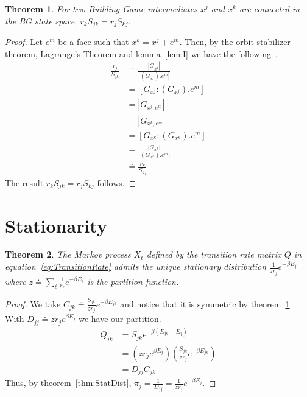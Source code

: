 \documentclass[12pt]{article}
\newtheorem{mythm}{Theorem}
\begin{document}
\begin{mythm}
\label{thm:J}
For two Building Game intermediates $x^j$ and $x^k$ are connected in the BG state space, $r_kS_{jk} = r_jS_{kj}$.
\end{mythm}
\begin{proof}
Let $e^m$ be a face such that $x^k = x^j + e^m$. Then, by the orbit-stabilizer theorem, Lagrange's Theorem and lemma~\ref{lem:I} we have the following~\cite{Rotman1995}.
\begin{align}
\frac{r_j}{S_{jk}} &\doteq \frac{\left|G_{x^j}\right|}{\left|\left(G_{x^j}\right).e^m\right|} \\
                   &= \left[G_{x^j} : \left(G_{x^j}\right).e^m \right] \\
                   &= \left|G_{x^j,e^m}\right| \\
                   &= \left|G_{x^k,e^m}\right| \\
                   &= \left[G_{x^k} : \left(G_{x^k}\right).e^m \right] \\
                   &= \frac{\left|G_{x^k}\right|}{\left|\left(G_{x^k}\right).e^m\right|} \\
                   &\doteq \frac{r_k}{S_{kj}} 
\end{align}
The result $r_kS_{jk} = r_jS_{kj}$ follows.
\end{proof}

\section{Stationarity}

\begin{mythm}
\label{thm:E}
The Markov process $X_t$ defined by the transition rate matrix $Q$ in equation~\ref{eq:TransitionRate} admits the unique stationary distribution $\frac{1}{zr_j}e^{-\beta E_j}$ where $z \doteq \sum_\ell \frac{1}{r_\ell}e^{-\beta E_\ell}$ is the partition function. 
\end{mythm}
\begin{proof}
We take $C_{jk} \doteq \frac{S_{jk}}{zr_j}e^{-\beta E_{jk}}$ and notice that it is symmetric by theorem~\ref{thm:J}. With $D_{jj} \doteq zr_je^{\beta E_j}$ we have our partition.  
\begin{align}
Q_{jk} &= S_{jk}e^{-\beta\left(E_{jk} - E_j\right)} \\
       &= \left(zr_je^{\beta E_j}\right) \left(\frac{S_{jk}}{zr_j}e^{-\beta E_{jk}}\right) \\
       &= D_{jj}C_{jk}   
\end{align}
Thus, by theorem~\ref{thm:StatDist},  $\pi_j = \frac{1}{D_{jj}} = \frac{1}{zr_j}e^{-\beta E_j}$.
\end{proof}
\end{document}

